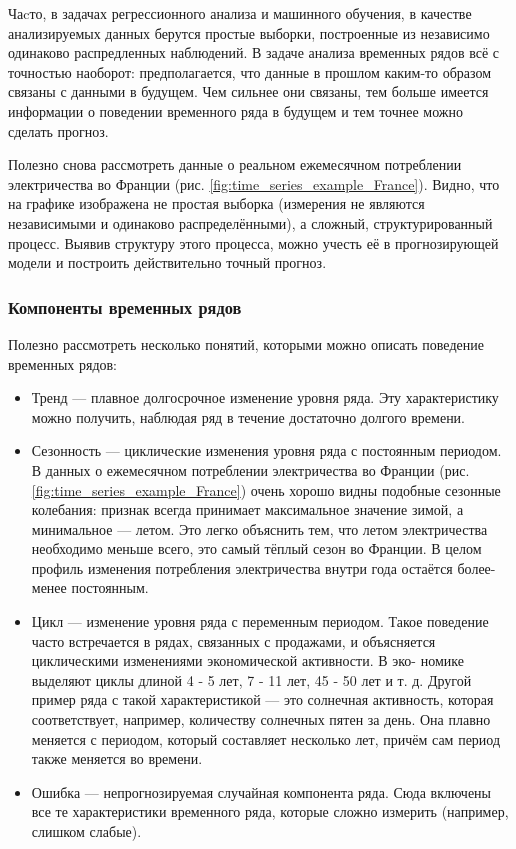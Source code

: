 Чаcто, в задачах регрессионного анализа и машинного обучения, в качестве анализируемых 
данных берутся простые выборки, построенные из независимо одинаково распредленных 
наблюдений. В задаче анализа временных рядов всё с точностью наоборот: 
предполагается, что данные в прошлом каким-то образом связаны с данными в будущем. 
Чем сильнее они связаны, тем больше имеется информации о поведении временного ряда 
в будущем и тем точнее можно сделать прогноз. 

Полезно снова рассмотреть данные о реальном ежемесячном потреблении электричества во Франции 
(рис. \ref{fig:time_series_example_France}). Видно, что на графике изображена не простая 
выборка (измерения не являются независимыми и одинаково распределёнными), а сложный, 
структурированный процесс. Выявив структуру этого процесса, можно учесть её в
прогнозирующей модели и построить действительно точный прогноз.

\subsubsection{Компоненты временных рядов}

Полезно рассмотреть несколько понятий, которыми можно описать поведение временных рядов:

\begin{itemize}
    \item Тренд — плавное долгосрочное изменение уровня ряда. Эту характеристику можно получить, наблюдая
    ряд в течение достаточно долгого времени.
    \item Сезонность — циклические изменения уровня ряда с постоянным периодом. В данных о ежемесячном 
    потреблении электричества во Франции (рис. \ref{fig:time_series_example_France}) очень хорошо видны подобные 
    сезонные колебания: признак всегда принимает максимальное значение зимой, а минимальное — летом. 
    Это легко объяснить тем, что летом электричества необходимо меньше всего, это самый тёплый сезон 
    во Франции. В целом профиль изменения потребления электричества внутри года остаётся более-менее 
    постоянным.
    \item Цикл — изменение уровня ряда с переменным периодом. Такое поведение часто встречается в рядах,
    связанных с продажами, и объясняется циклическими изменениями экономической активности. В эко-
    номике выделяют циклы длиной 4 - 5 лет, 7 - 11 лет, 45 - 50 лет и т. д. Другой пример ряда с такой
    характеристикой — это солнечная активность, которая соответствует, например, количеству солнечных
    пятен за день. Она плавно меняется с периодом, который составляет несколько лет, причём сам период
    также меняется во времени.
    \item Ошибка — непрогнозируемая случайная компонента ряда. Сюда включены все те характеристики временного ряда, 
    которые сложно измерить (например, слишком слабые).
\end{itemize}

